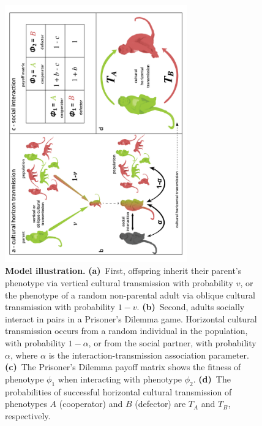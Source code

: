 \documentclass[12pt]{extarticle}
\begin{document}
\begin{figure}[pt]
  \centering
  \includegraphics[width=0.7\textwidth]{../PRSB_figures/fig_1.pdf}
  \caption{\textbf{Model illustration.} 
  \textbf{(a)}~First, offspring inherit their parent's phenotype via vertical cultural transmission with probability $v$, or the phenotype of a random non-parental adult via oblique cultural transmission with probability $1-v$.
  \textbf{(b)}~Second, adults socially interact in pairs in a Prisoner's Dilemma game. Horizontal cultural transmission occurs from a random individual in the population, with probability $1-\alpha$, or from the social partner, with probability $\alpha$, where $\alpha$ is the interaction-transmission association parameter.
  \textbf{(c)}~The Prisoner's Dilemma payoff matrix shows the fitness of phenotype $\phi_1$ when interacting with phenotype $\phi_2$.
    \textbf{(d)}~The probabilities of successful horizontal cultural transmission of phenotypes $A$ (cooperator) and $B$ (defector) are $T_A$ and $T_B$, respectively.
    }
  \label{fig:illustration}
\end{figure}
\end{document}
